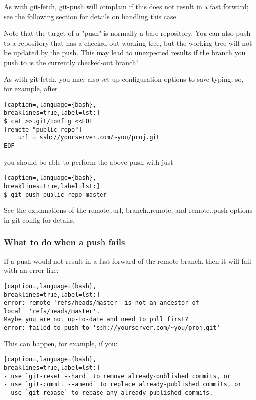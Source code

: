 As with git-fetch, git-push will complain if this does not result in a fast
forward; see the following section for details on handling this case.

Note that the target of a "push" is normally a bare repository. You can also
push to a repository that has a checked-out working tree, but the working tree
will not be updated by the push. This may lead to unexpected results if the
branch you push to is the currently checked-out branch!

As with git-fetch, you may also set up configuration options to save typing;
so, for example, after
\lstset{basicstyle=\scriptsize, numbers=none, captionpos=b, tabsize=4}
\begin{lstlisting}[caption=,language={bash},
breaklines=true,label=lst:]
$ cat >>.git/config <<EOF
[remote "public-repo"]
    url = ssh://yourserver.com/~you/proj.git
EOF
\end{lstlisting}

you should be able to perform the above push with just
\lstset{basicstyle=\scriptsize, numbers=none, captionpos=b, tabsize=4}
\begin{lstlisting}[caption=,language={bash},
breaklines=true,label=lst:]
$ git push public-repo master
\end{lstlisting}

See the explanations of the remote..url, branch..remote, and remote..push
options in git config for details.

\subsubsection{What to do when a push fails}
If a push would not result in a fast forward of the remote branch, then it will
fail with an error like:
\lstset{basicstyle=\scriptsize, numbers=none, captionpos=b, tabsize=4}
\begin{lstlisting}[caption=,language={bash},
breaklines=true,label=lst:]
error: remote 'refs/heads/master' is not an ancestor of
local  'refs/heads/master'.
Maybe you are not up-to-date and need to pull first?
error: failed to push to 'ssh://yourserver.com/~you/proj.git'
\end{lstlisting}

This can happen, for example, if you:
\lstset{basicstyle=\scriptsize, numbers=none, captionpos=b, tabsize=4}
\begin{lstlisting}[caption=,language={bash},
breaklines=true,label=lst:]
- use `git-reset --hard` to remove already-published commits, or
- use `git-commit --amend` to replace already-published commits, or
- use `git-rebase` to rebase any already-published commits.
\end{lstlisting}

